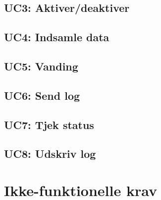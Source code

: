 
\subsection{UC3: Aktiver/deaktiver}



\subsection{UC4: Indsamle data}



\subsection{UC5: Vanding}



\subsection{UC6: Send log}



\subsection{UC7: Tjek status}


\subsection{UC8: Udskriv log}



\section{Ikke-funktionelle krav}
